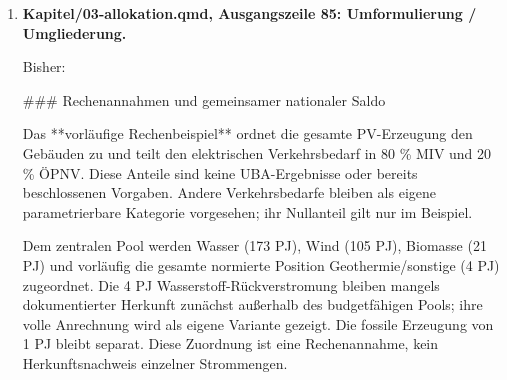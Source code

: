 \documentclass[
  ngerman,
  a4paper,
  DIV=11]{scrreprt}
\newenvironment{Shaded}{\begin{snugshade}}{\end{snugshade}}
\newcommand{\NormalTok}[1]{\textcolor[rgb]{0.00,0.23,0.31}{#1}}
\begin{document}
\begin{enumerate}
  Bisher:

\begin{Shaded}
\begin{Highlighting}[]
\NormalTok{Der ausführbare Anhang @sec{-}allokation{-}notebook enthält die vollständigen Berechnungen, Parameter und Bilanzkontrollen. Grundlage sind REP{-}0880 Tabelle 15 (S. 60) und Tabelle 16 (S. 63). Das Modell arbeitet mit 457 PJ Stromerzeugung, 7 PJ Nettoexport und 452 PJ Bedarfskomponenten. Die publizierte Bedarfssumme beträgt 450 PJ; der Komponentenrest von −2 PJ wird erhalten [@uba2023transition].}
\end{Highlighting}
\end{Shaded}

  Jetzt:

\begin{Shaded}
\begin{Highlighting}[]
\NormalTok{Die Rechnung verwendet 457 PJ/a Erzeugung, 7 PJ/a Nettoexport und 452 PJ/a Bedarfskomponenten. Der Rest von −2 PJ/a bleibt in der nationalen Zuordnungsbilanz erhalten. Die veröffentlichten Summen und ihre Rundungsreste stehen in @sec{-}szenariotabellen.}
\end{Highlighting}
\end{Shaded}
\item
  \textbf{Kapitel/03-allokation.qmd, Ausgangszeile 85: Umformulierung /
  Umgliederung.}

  Bisher:

\begin{Shaded}
\begin{Highlighting}[]
\NormalTok{\#\#\# Rechenannahmen und gemeinsamer nationaler Saldo}

\NormalTok{Das **vorläufige Rechenbeispiel** ordnet die gesamte PV{-}Erzeugung den Gebäuden zu und teilt den elektrischen Verkehrsbedarf in 80 \% MIV und 20 \% ÖPNV. Diese Anteile sind keine UBA{-}Ergebnisse oder bereits beschlossenen Vorgaben. Andere Verkehrsbedarfe bleiben als eigene parametrierbare Kategorie vorgesehen; ihr Nullanteil gilt nur im Beispiel.}

\NormalTok{Dem zentralen Pool werden Wasser (173 PJ), Wind (105 PJ), Biomasse (21 PJ) und vorläufig die gesamte normierte Position Geothermie/sonstige (4 PJ) zugeordnet. Die 4 PJ Wasserstoff{-}Rückverstromung bleiben mangels dokumentierter Herkunft zunächst außerhalb des budgetfähigen Pools; ihre volle Anrechnung wird als eigene Variante gezeigt. Die fossile Erzeugung von 1 PJ bleibt separat. Diese Zuordnung ist eine Rechenannahme, kein Herkunftsnachweis einzelner Strommengen.}


\end{Highlighting}
\end{Shaded}
\end{enumerate}
\end{document}
